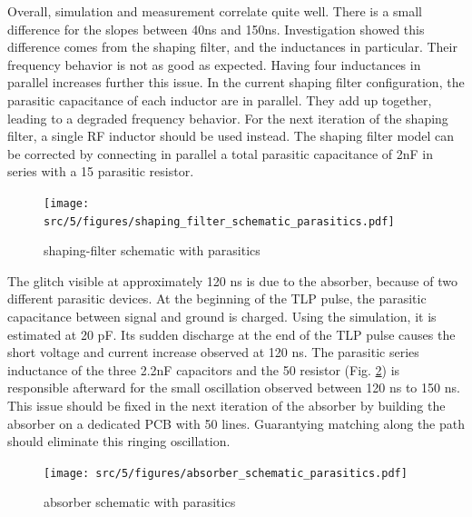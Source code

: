 Overall, simulation and measurement correlate quite well.
There is a small difference for the slopes between 40ns and 150ns.
Investigation showed this difference comes from the shaping filter, and the inductances in particular.
Their frequency behavior is not as good as expected.
Having four inductances in parallel increases further this issue.
In the current shaping filter configuration, the parasitic capacitance of each inductor are in parallel.
They add up together, leading to a degraded frequency behavior.
For the next iteration of the shaping filter, a single RF inductor should be used instead.
The shaping filter model can be corrected by connecting in parallel a total parasitic capacitance of 2nF in series with a 15\textOmega{} parasitic resistor.

\begin{figure}[!h]
  \centering
  \texttt{[image: src/5/figures/shaping\_filter\_schematic\_parasitics.pdf]}
  \caption{shaping-filter schematic with parasitics}
  \label{fig:shaping_filter_schematic_parasitics}
\end{figure}

The glitch visible at approximately 120 ns is due to the absorber, because of two different parasitic devices.
At the beginning of the TLP pulse, the parasitic capacitance between signal and ground is charged.
Using the simulation, it is estimated at 20 pF.
Its sudden discharge at the end of the TLP pulse causes the short voltage and current increase observed at 120 ns.
The parasitic series inductance of the three 2.2nF capacitors and the 50\textOmega{} resistor (Fig. \ref{fig:absorber_schematic_parasitics}) is responsible afterward for the small oscillation observed between 120 ns to 150 ns.
This issue should be fixed in the next iteration of the absorber by building the absorber on a dedicated PCB with 50\textOmega{} lines.
Guarantying matching along the path should eliminate this ringing oscillation.

\begin{figure}[!h]
  \centering
  \texttt{[image: src/5/figures/absorber\_schematic\_parasitics.pdf]}
  \caption{absorber schematic with parasitics}
  \label{fig:absorber_schematic_parasitics}
\end{figure}


